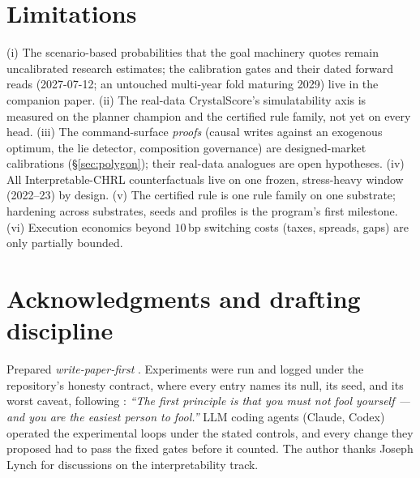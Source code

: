 \documentclass[11pt]{article}
\begin{document}
\section{Limitations}
\label{sec:limits}
(i) The scenario-based probabilities that the goal machinery quotes remain uncalibrated
research estimates; the calibration gates and their dated forward reads (2027-07-12; an
untouched multi-year fold maturing 2029) live in the companion paper. (ii) The real-data
CrystalScore's simulatability axis is measured on the planner champion and the certified rule
family, not yet on every head. (iii) The command-surface \emph{proofs} (causal writes
against an exogenous optimum, the lie detector, composition governance) are designed-market
calibrations (\S\ref{sec:polygon}); their real-data analogues are open hypotheses. (iv) All
Interpretable-CHRL counterfactuals live on one frozen, stress-heavy window (2022--23) by
design. (v) The certified rule is one rule family on one substrate; hardening across
substrates, seeds and profiles is the program's first milestone. (vi) Execution economics
beyond $10$\,bp switching costs (taxes, spreads, gaps) are only partially bounded.

\section*{Acknowledgments and drafting discipline}
Prepared \emph{write-paper-first} \citep{eisner-paper-first}. Experiments were run and logged
under the repository's honesty contract, where every entry names its null, its seed, and its worst
caveat, following \citet{feynman1974}: \emph{``The first principle is that you must
not fool yourself --- and you are the easiest person to fool.''} LLM coding agents (Claude,
Codex) operated the experimental loops under the stated controls, and every change they proposed
had to pass the fixed gates before it counted. The author thanks Joseph Lynch for discussions on
the interpretability track.



\end{document}
